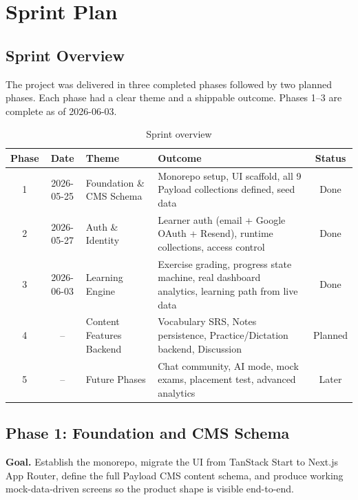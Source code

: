 \section{Sprint Plan}

\subsection{Sprint Overview}

The project was delivered in three completed phases followed by two planned phases. Each phase had a clear theme and a shippable outcome. Phases 1--3 are complete as of 2026-06-03.

\begin{table}[H]
\centering
\begin{tabularx}{\linewidth}{c c X X c}
\toprule
Phase & Date & Theme & Outcome & Status \\
\midrule
1 & 2026-05-25 & Foundation \& CMS Schema & Monorepo setup, UI scaffold, all 9 Payload collections defined, seed data & Done \\
2 & 2026-05-27 & Auth \& Identity & Learner auth (email + Google OAuth + Resend), runtime collections, access control & Done \\
3 & 2026-06-03 & Learning Engine & Exercise grading, progress state machine, real dashboard analytics, learning path from live data & Done \\
4 & -- & Content Features Backend & Vocabulary SRS, Notes persistence, Practice/Dictation backend, Discussion & Planned \\
5 & -- & Future Phases & Chat community, AI mode, mock exams, placement test, advanced analytics & Later \\
\bottomrule
\end{tabularx}
\caption{Sprint overview}
\end{table}

\subsection{Phase 1: Foundation and CMS Schema}
\label{sec:phase1}

\textbf{Goal.} Establish the monorepo, migrate the UI from TanStack Start to Next.js App Router, define the full Payload CMS content schema, and produce working mock-data-driven screens so the product shape is visible end-to-end.

